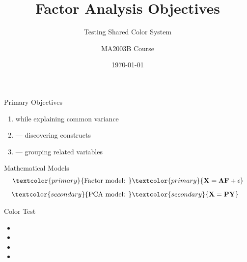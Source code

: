 \documentclass{beamer}
\title{Factor Analysis Objectives}
\subtitle{Testing Shared Color System}
\author{MA2003B Course}
\date{\today}
\begin{document}
\begin{frame}
\titlepage
\end{frame}

\begin{frame}{Primary Objectives}
\begin{enumerate}
  \item {} while explaining common variance
  \item {} — discovering constructs
  \item {} — grouping related variables
\end{enumerate}
\end{frame}

\begin{frame}{Mathematical Models}
\begin{align*}
  \textcolor{primary}{\text{Factor model: }} &\textcolor{primary}{\mathbf{X} = \mathbf{\Lambda F} + \mathbf{\epsilon}}\\[0.5em]
  \textcolor{secondary}{\text{PCA model: }} &\textcolor{secondary}{\mathbf{X} = \mathbf{PY}}
\end{align*}
\end{frame}

\begin{frame}{Color Test}
\begin{itemize}
  \item {}
  \item {}  
  \item {}
  \item {}
\end{itemize}
\end{frame}
\end{document}
